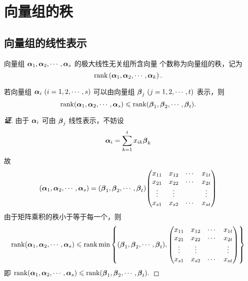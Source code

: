 \section{向量组的秩}

\subsection{向量组的线性表示}

\begin{definition}[向量组的秩]
    向量组 $ \vb*{\alpha}_{1}, \vb*{\alpha}_{2}, \cdots, \vb*{\alpha}_{s} $ 的极大线性无关组所含向量 个数称为向量组的秩，记为 
    $$ \rank\left(\vb*{\alpha}_{1}, \vb*{\alpha}_{2}, \cdots, \vb*{\alpha}_{k}\right) .$$
\end{definition}

\begin{theorem}
    若向量组 $\vb*{\alpha}_i~ (i=1,2,\cdots,s)$ 可以由向量组 $\vb*{\beta}_j~ (j=1,2,\cdots,t)$ 表示，则
    $$\rank(\vb*{\alpha}_1,\vb*{\alpha}_2,\cdots,\vb*{\alpha}_s)\leqslant \rank(\vb*{\beta}_1,\vb*{\beta}_2,\cdots,\vb*{\beta}_t).$$
\end{theorem}
\begin{proof}[{\songti \textbf{证}}]
    由于 $\vb*{\alpha}_i$ 可由 $\vb*{\beta}_j$ 线性表示，不妨设 $$\vb*{\alpha}_i=\sum_{k=1}^{t}x_{ik}\vb*{\beta}_k$$
    故 $$(\vb*{\alpha}_1,\vb*{\alpha}_2,\cdots,\vb*{\alpha}_s)=(\vb*{\beta}_1,\vb*{\beta}_2,\cdots,\vb*{\beta}_t)\mqty(x_{11}&x_{12}&\cdots&x_{1t}\\x_{21}&x_{22}&\cdots&x_{2t}\\\vdots &\vdots&&\vdots\\x_{s1}&x_{s2}&\cdots&x_{st})$$
    由于矩阵乘积的秩小于等于每一个，则
    $$\rank(\vb*{\alpha}_1,\vb*{\alpha}_2,\cdots,\vb*{\alpha}_s)\leqslant \rank\min\qty{(\vb*{\beta}_1,\vb*{\beta}_2,\cdots,\vb*{\beta}_t),\mqty(x_{11}&x_{12}&\cdots&x_{1t}\\x_{21}&x_{22}&\cdots&x_{2t}\\\vdots &\vdots&&\vdots\\x_{s1}&x_{s2}&\cdots&x_{st})}$$
    即 $\rank(\vb*{\alpha}_1,\vb*{\alpha}_2,\cdots,\vb*{\alpha}_s)\leqslant \rank(\vb*{\beta}_1,\vb*{\beta}_2,\cdots,\vb*{\beta}_t).$
\end{proof}

